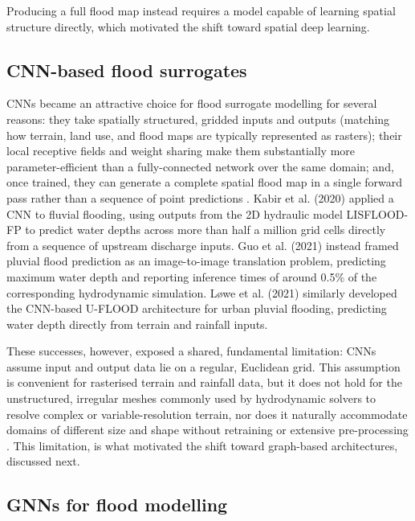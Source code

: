 \documentclass[12pt,a4paper]{report}
\begin{document}
Producing a full flood map instead requires a model capable of learning spatial
structure directly, which motivated the shift toward spatial deep learning.

\subsection{CNN-based flood surrogates}
\label{subsec:cnn}

CNNs became an attractive choice for flood surrogate modelling for several reasons: they
take spatially structured, gridded inputs and outputs (matching how terrain, land use,
and flood maps are typically represented as rasters); their local receptive fields and
weight sharing make them substantially more parameter-efficient than a fully-connected
network over the same domain; and, once trained, they can generate a complete spatial
flood map in a single forward pass rather than a sequence of point predictions
. Kabir et al. (2020) applied a CNN to fluvial flooding, using outputs from the 2D hydraulic model LISFLOOD-FP to predict water depths across more than half a million grid cells directly from a sequence of upstream discharge inputs. Guo et al. (2021) instead framed pluvial flood prediction as an image-to-image translation problem, predicting maximum water depth and reporting inference times of around 0.5\% of the corresponding hydrodynamic simulation. Løwe et al. (2021) similarly developed the CNN-based U-FLOOD architecture for urban pluvial flooding, predicting water depth directly from terrain and rainfall inputs.

 
These successes, however, exposed a shared, fundamental limitation: CNNs assume input
and output data lie on a regular, Euclidean grid. This assumption is convenient for
rasterised terrain and rainfall data, but it does not hold for the unstructured,
irregular meshes commonly used by hydrodynamic solvers to resolve complex or
variable-resolution terrain, nor does it naturally accommodate domains of different size
and shape without retraining or extensive pre-processing
\citep{bentivoglio2023swegnn,bentivoglio2022review}. This limitation, is what motivated the shift toward graph-based architectures, discussed
next.
 
\subsection{GNNs for flood modelling}
\label{subsec:gnn}
 
\end{document}
